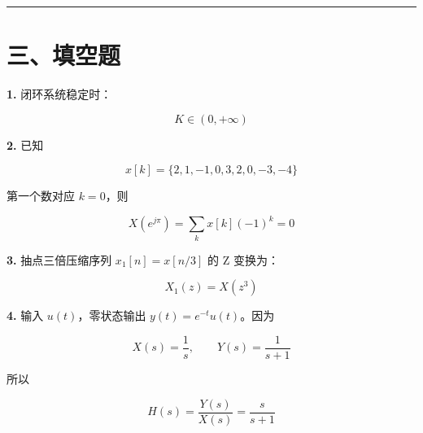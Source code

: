\documentclass[11pt]{ctexart}
\begin{document}
\medskip\hrule\medskip



\section*{三、填空题}



\noindent\textbf{1.} 闭环系统稳定时：\par



\[

   K\in(0,+\infty)

   \]



\noindent\textbf{2.} 已知\par



\[

   x[k]=\{2,1,-1,0,3,2,0,-3,-4\}

   \]



第一个数对应 \(k=0\)，则\par



\[

   X(e^{j\pi})=\sum_k x[k](-1)^k=0

   \]



\noindent\textbf{3.} 抽点三倍压缩序列 \(x_1[n]=x[n/3]\) 的 Z 变换为：\par



\[

   X_1(z)=X(z^3)

   \]



\noindent\textbf{4.} 输入 \(u(t)\)，零状态输出 \(y(t)=e^{-t}u(t)\)。因为\par



\[

   X(s)=\frac{1}{s},\qquad Y(s)=\frac{1}{s+1}

   \]



所以\par



\[

   H(s)=\frac{Y(s)}{X(s)}=\frac{s}{s+1}

   \]
\end{document}
